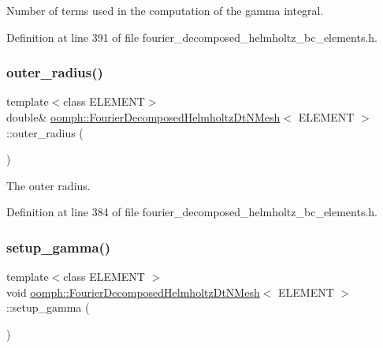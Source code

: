 Number of terms used in the computation of the gamma integral. 



Definition at line 391 of file fourier\+\_\+decomposed\+\_\+helmholtz\+\_\+bc\+\_\+elements.\+h.

\mbox{\label{classoomph_1_1FourierDecomposedHelmholtzDtNMesh_a6aff7dd5330464d53d9d71d0f6a02dde}} 
\subsubsection{\texorpdfstring{outer\+\_\+radius()}{outer\_radius()}}
{\footnotesize\ttfamily template$<$class E\+L\+E\+M\+E\+NT$>$ \\
double\& \hyperlink{classoomph_1_1FourierDecomposedHelmholtzDtNMesh}{oomph\+::\+Fourier\+Decomposed\+Helmholtz\+Dt\+N\+Mesh}$<$ E\+L\+E\+M\+E\+NT $>$\+::outer\+\_\+radius (\begin{DoxyParamCaption}{ }\end{DoxyParamCaption})\hspace{0.3cm}{\ttfamily [inline]}}



The outer radius. 



Definition at line 384 of file fourier\+\_\+decomposed\+\_\+helmholtz\+\_\+bc\+\_\+elements.\+h.

\mbox{\label{classoomph_1_1FourierDecomposedHelmholtzDtNMesh_a6edd6895062bd0d756f7c4dfc585b284}} 
\subsubsection{\texorpdfstring{setup\+\_\+gamma()}{setup\_gamma()}}
{\footnotesize\ttfamily template$<$class E\+L\+E\+M\+E\+NT $>$ \\
void \hyperlink{classoomph_1_1FourierDecomposedHelmholtzDtNMesh}{oomph\+::\+Fourier\+Decomposed\+Helmholtz\+Dt\+N\+Mesh}$<$ E\+L\+E\+M\+E\+NT $>$\+::setup\+\_\+gamma (\begin{DoxyParamCaption}{ }\end{DoxyParamCaption})}




